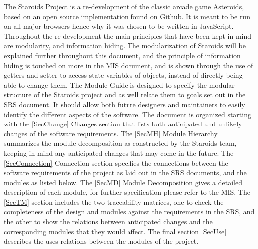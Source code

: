 \documentclass[12pt, titlepage]{article}
\begin{document}
The Staroids Project is a re-development of the classic arcade game Asteroids, based on an open source implementation found on Github. It is meant to be run on all major browsers hence why it was chosen to be written in JavaScript. Throughout the re-development the main principles that have been kept in mind are modularity, and information hiding. The modularization of Staroids will be explained further throughout this document, and the principle of information hiding is touched on more in the MIS document, and is shown through the use of getters and setter to access state variables of objects, instead of directly being able to change them. The Module Guide is designed to specify the modular structure of the Staroids project and as well relate them to goals set out in the SRS document. It should allow both future designers and maintainers to easily identify the different aspects of the software. The document is organized starting with the \ref{SecChange} Changes section that lists both anticipated and unlikely changes of the software requirements. The \ref{SecMH} Module Hierarchy summarizes the module decomposition as constructed by the Staroids team, keeping in mind any anticipated changes that may come in the future. The \ref{SecConnection} Connection section specifies the connections between the software requirements of the project as laid out in the SRS documents, and the modules as listed below. The \ref{SecMD} Module Decomposition gives a detailed description of each module, for further specification please refer to the MIS. The \ref{SecTM} section includes the two traceability matrices, one to check the completeness of the design and modules against the requirements in the SRS, and the other to show the relations between anticipated changes and the corresponding modules that they would affect. The final section \ref{SecUse} describes the uses relations between the modules of the project.




\end{document}
